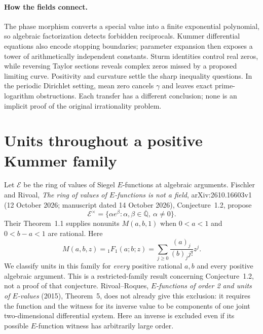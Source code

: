 \documentclass[11pt,a4paper]{article}
\theoremstyle{definition}
\theoremstyle{remark}
\numberwithin{equation}{section}
\begin{document}
\paragraph{How the fields connect.}
The phase morphism converts a special value into a finite exponential
polynomial, so algebraic factorization detects forbidden reciprocals.
Kummer differential equations also encode stopping boundaries; parameter
expansion then exposes a tower of arithmetically independent constants.
Sturm identities control real zeros, while reversing Taylor sections
reveals complex zeros missed by a proposed limiting curve. Positivity
and curvature settle the sharp inequality questions. In the periodic
Dirichlet setting, mean zero cancels $\gamma$ and leaves exact
prime-logarithm obstructions. Each transfer has a different conclusion;
none is an implicit proof of the original irrationality problem.



\section{Units throughout a positive Kummer family}
\label{p2:sec:kummer-units-round2}

Let $\mathcal E$ be the ring of values of Siegel $E$-functions at algebraic
arguments.  Fischler and Rivoal, \emph{The ring of values of $E$-functions is
not a field}, arXiv:2610.16603v1 (12 October 2026; manuscript dated
14 October 2026), Conjecture~1.2, propose
\[
 \mathcal E^\times=\{\alpha e^\beta:
     \alpha,\beta\in\overline{\mathbb Q},\ \alpha\ne0\}.
\]
Their Theorem~1.1 supplies nonunits $M(a,b,1)$ when
$0<a<1$ and $0<b-a<1$ are rational.  Here
\[
 M(a,b,z)={}_1F_1(a;b;z)
       =\sum_{j\ge0}\frac{(a)_j}{(b)_j j!}z^j.
\]
We classify units in this family for \emph{every} positive rational
$a,b$ and every positive algebraic argument.  This is a restricted-family
result concerning Conjecture~1.2, not a proof of that conjecture.
Rivoal--Roques, \emph{$E$-functions of order 2 and units of $E$-values}
(2015), Theorem~5, does not already give this exclusion: it requires the
function and the witness for its inverse value to be components of one
joint two-dimensional differential system.  Here an inverse is excluded
even if its possible $E$-function witness has arbitrarily large order.
\end{document}

